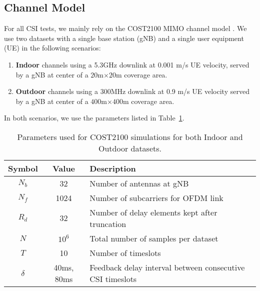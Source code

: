 \subsection{Channel Model}
\label{sect:channel_model}

For all CSI tests, we mainly rely on the COST2100 MIMO channel model \cite{ref:liu2012cost2100}. We use two datasets with a single base station (gNB) and a single user equipment (UE) in the following scenarios:
\begin{enumerate}
	\item \textbf{Indoor} channels using a 5.3GHz downlink at
	0.001 m/s UE velocity, served by a
	gNB at center of a $20$m$\times 20$m coverage area.
	\item \textbf{Outdoor} channels using a 300MHz downlink at 0.9 m/s UE velocity served by a gNB at center 
	of a $400$m$\times 400$m coverage area.
\end{enumerate}
In both scenarios, we use the parameters listed in Table~\ref{tab:cost-params}.
\begin{table}[]
\centering
\caption{Parameters used for COST2100 simulations for both Indoor and Outdoor datasets.}
\label{tab:cost-params}
\begin{tabular}{c|c|l}
\toprule
\textbf{Symbol} & \textbf{Value} & \textbf{Description} \\ \midrule
$N_b$ 			& 32			 & Number of antennas at gNB  \\ \hline
$N_f$ 			& 1024			 & Number of subcarriers for OFDM link  \\ \hline
$R_d$ 			& 32			 & Number of delay elements kept after truncation  \\ \hline
$N$ 			& $10^6$		 & Total number of samples per dataset  \\ \hline
$T$ 			& 10		 	 & Number of timeslots  \\ \hline
$\delta$		& 40ms, 80ms	 & Feedback delay interval between consecutive CSI timeslots  \\ \bottomrule
\end{tabular}
\end{table}
